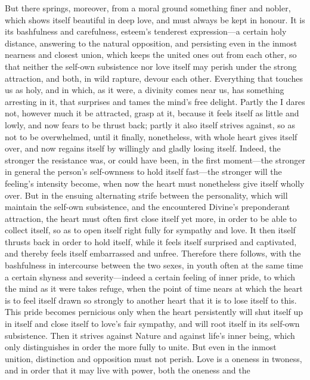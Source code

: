 \documentclass[12pt,a4paper]{book}
\begin{document}
But there springs, moreover, from a moral ground something finer and
nobler, which shows itself beautiful in deep love, and must always be kept
in honour. It is its bashfulness and carefulness, esteem's tenderest
expression---a certain holy distance, answering to the natural opposition,
and persisting even in the inmost nearness and closest union, which keeps
the united ones out from each other, so that neither the self-own
subsistence nor love itself may perish under the strong attraction, and
both, in wild rapture, devour each other. Everything that touches us as
holy, and in which, as it were, a divinity comes near us, has something
arresting in it, that surprises and tames the mind's free delight. Partly
the I dares not, however much it be attracted, grasp at it, because it
feels itself as little and lowly, and now fears to be thrust back; partly it
also itself strives against, so as not to be overwhelmed, until it finally,
nonetheless, with whole heart gives itself over, and now regains itself by
willingly and gladly losing itself. Indeed, the stronger the resistance
was, or could have been, in the first moment---the stronger in general the
person's self-ownness to hold itself fast---the stronger will the feeling's
intensity become, when now the heart must nonetheless give itself wholly
over. But in the ensuing alternating strife between the personality, which
will maintain the self-own subsistence, and the encountered Divine's
preponderant attraction, the heart must often first close itself yet more,
in order to be able to collect itself, so as to open itself right fully for
sympathy and love. It then itself thrusts back in order to hold itself,
while it feels itself surprised and captivated, and thereby feels itself
embarrassed and unfree. Therefore there follows, with the bashfulness in
intercourse between the two sexes, in youth often at the same time a
certain shyness and severity---indeed a certain feeling of inner pride, to
which the mind as it were takes refuge, when the point of time nears at
which the heart is to feel itself drawn so strongly to another heart that
it is to lose itself to this. This pride becomes pernicious only when the
heart persistently will shut itself up in itself and close itself to love's
fair sympathy, and will root itself in its self-own subsistence. Then it
strives against Nature and against life's inner being, which only
distinguishes in order the more fully to unite. But even in the inmost
unition, distinction and opposition must not perish. Love is a oneness in
twoness, and in order that it may live with power, both the oneness and the
\end{document}
